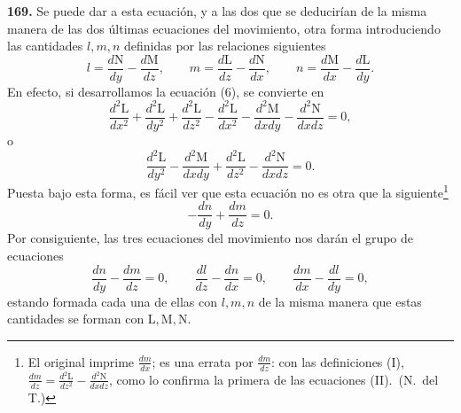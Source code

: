 \noindent\textbf{169.} Se puede dar a esta ecuación, y a las dos que se
deducirían de la misma manera de las dos últimas ecuaciones del
movimiento, otra forma introduciendo las cantidades $l,m,n$ definidas por
las relaciones siguientes
\begin{equation}
l=\frac{d\mathrm N}{dy}-\frac{d\mathrm M}{dz},\qquad
m=\frac{d\mathrm L}{dz}-\frac{d\mathrm N}{dx},\qquad
n=\frac{d\mathrm M}{dx}-\frac{d\mathrm L}{dy}.
\tag{I}
\end{equation}
En efecto, si desarrollamos la ecuación (6), se convierte en
\[
\frac{d^2\mathrm L}{dx^2}+\frac{d^2\mathrm L}{dy^2}+\frac{d^2\mathrm L}{dz^2}
-\frac{d^2\mathrm L}{dx^2}-\frac{d^2\mathrm M}{dxdy}-\frac{d^2\mathrm N}{dxdz}=0,
\]
o
\[
\frac{d^2\mathrm L}{dy^2}-\frac{d^2\mathrm M}{dxdy}+\frac{d^2\mathrm L}{dz^2}-\frac{d^2\mathrm N}{dxdz}=0.
\]
Puesta bajo esta forma, es fácil ver que esta ecuación no es otra que la
siguiente\footnote{El original imprime $\frac{dm}{dx}$; es una errata por
$\frac{dm}{dz}$: con las definiciones (I), $\frac{dm}{dz}
=\frac{d^2\mathrm L}{dz^2}-\frac{d^2\mathrm N}{dxdz}$, como lo confirma la
primera de las ecuaciones (II).~(N.~del T.)}
\[
-\frac{dn}{dy}+\frac{dm}{dz}=0.
\]
Por consiguiente, las tres ecuaciones del movimiento nos darán el grupo de
ecuaciones
\begin{equation}
\frac{dn}{dy}-\frac{dm}{dz}=0,\qquad
\frac{dl}{dz}-\frac{dn}{dx}=0,\qquad
\frac{dm}{dx}-\frac{dl}{dy}=0,
\tag{II}
\end{equation}
estando formada cada una de ellas con $l,m,n$ de la misma manera que estas
cantidades se forman con $\mathrm L,\mathrm M,\mathrm N$.

